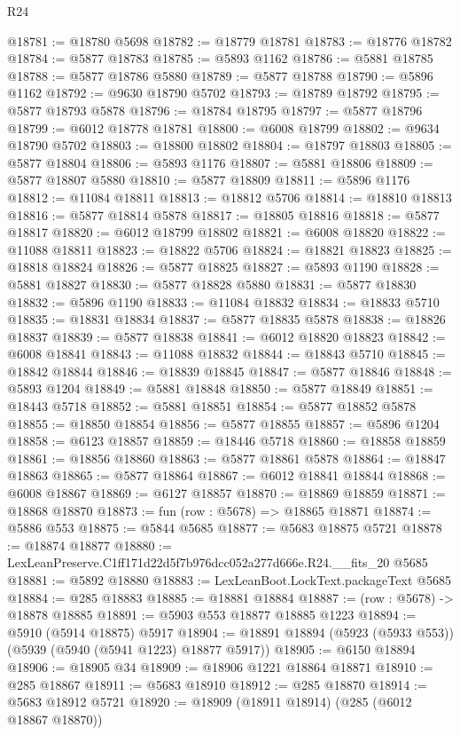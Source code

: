 \begin{lexlean}{R24}
\begin{coremodule}
@18781 := @18780 @5698
@18782 := @18779 @18781
@18783 := @18776 @18782
@18784 := @5877 @18783
@18785 := @5893 @1162
@18786 := @5881 @18785
@18788 := @5877 @18786 @5880
@18789 := @5877 @18788
@18790 := @5896 @1162
@18792 := @9630 @18790 @5702
@18793 := @18789 @18792
@18795 := @5877 @18793 @5878
@18796 := @18784 @18795
@18797 := @5877 @18796
@18799 := @6012 @18778 @18781
@18800 := @6008 @18799
@18802 := @9634 @18790 @5702
@18803 := @18800 @18802
@18804 := @18797 @18803
@18805 := @5877 @18804
@18806 := @5893 @1176
@18807 := @5881 @18806
@18809 := @5877 @18807 @5880
@18810 := @5877 @18809
@18811 := @5896 @1176
@18812 := @11084 @18811
@18813 := @18812 @5706
@18814 := @18810 @18813
@18816 := @5877 @18814 @5878
@18817 := @18805 @18816
@18818 := @5877 @18817
@18820 := @6012 @18799 @18802
@18821 := @6008 @18820
@18822 := @11088 @18811
@18823 := @18822 @5706
@18824 := @18821 @18823
@18825 := @18818 @18824
@18826 := @5877 @18825
@18827 := @5893 @1190
@18828 := @5881 @18827
@18830 := @5877 @18828 @5880
@18831 := @5877 @18830
@18832 := @5896 @1190
@18833 := @11084 @18832
@18834 := @18833 @5710
@18835 := @18831 @18834
@18837 := @5877 @18835 @5878
@18838 := @18826 @18837
@18839 := @5877 @18838
@18841 := @6012 @18820 @18823
@18842 := @6008 @18841
@18843 := @11088 @18832
@18844 := @18843 @5710
@18845 := @18842 @18844
@18846 := @18839 @18845
@18847 := @5877 @18846
@18848 := @5893 @1204
@18849 := @5881 @18848
@18850 := @5877 @18849
@18851 := @18443 @5718
@18852 := @5881 @18851
@18854 := @5877 @18852 @5878
@18855 := @18850 @18854
@18856 := @5877 @18855
@18857 := @5896 @1204
@18858 := @6123 @18857
@18859 := @18446 @5718
@18860 := @18858 @18859
@18861 := @18856 @18860
@18863 := @5877 @18861 @5878
@18864 := @18847 @18863
@18865 := @5877 @18864
@18867 := @6012 @18841 @18844
@18868 := @6008 @18867
@18869 := @6127 @18857
@18870 := @18869 @18859
@18871 := @18868 @18870
@18873 := fun (row : @5678) => @18865 @18871
@18874 := @5886 @553
@18875 := @5844 @5685
@18877 := @5683 @18875 @5721
@18878 := @18874 @18877
@18880 := LexLeanPreserve.C1ff171d22d5f7b976dcc052a277d666e.R24.__fits_20 @5685
@18881 := @5892 @18880
@18883 := LexLeanBoot.LockText.packageText @5685
@18884 := @285 @18883
@18885 := @18881 @18884
@18887 := (row : @5678) -> @18878 @18885
@18891 := @5903 @553 @18877 @18885 @1223
@18894 := @5910 (@5914 @18875) @5917
@18904 := @18891 @18894 (@5923 (@5933 @553)) (@5939 (@5940 (@5941 @1223) @18877 @5917))
@18905 := @6150 @18894
@18906 := @18905 @34
@18909 := @18906 @1221 @18864 @18871
@18910 := @285 @18867
@18911 := @5683 @18910
@18912 := @285 @18870
@18914 := @5683 @18912 @5721
@18920 := @18909 (@18911 @18914) (@285 (@6012 @18867 @18870))

\end{coremodule}
\end{lexlean}
